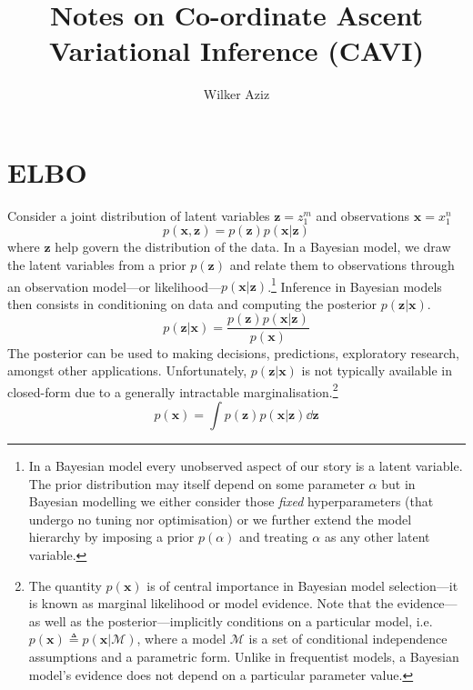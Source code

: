 \documentclass[11pt]{article}
\title{Notes on Co-ordinate Ascent Variational Inference (CAVI)}
\author{Wilker Aziz}
\newcommand{\x}{\ensuremath{\mathbf x}}
\newcommand{\z}{\ensuremath{\mathbf z}}
\begin{document}
\maketitle

\section{ELBO}

Consider a joint distribution of latent variables $\z = z_1^m$ and observations $\x=x_1^n$
\begin{equation}
p(\x, \z) = p(\z)p(\x|\z)
\end{equation}
 where $\z$ help govern the distribution of the data. 
 In a Bayesian model, we draw the latent variables from a prior $p(\z)$ and relate them to observations through an observation model---or likelihood---$p(\x|\z)$.\footnote{
In a Bayesian model every unobserved aspect of our story is a latent variable. The prior distribution may itself depend on some parameter $\alpha$ but in Bayesian modelling we either consider those \emph{fixed} hyperparameters (that undergo no tuning nor optimisation) or we further extend the model hierarchy by imposing a prior $p(\alpha)$ and treating $\alpha$ as any other latent variable.}
Inference in Bayesian models then consists in conditioning on data and computing the posterior $p(\z|\x)$.
 \begin{equation}\label{eq:posterior}
 	p(\z|\x) = \frac{p(\z)p(\x|\z)}{p(\x)}
 \end{equation}
The posterior can be used to making decisions, predictions, exploratory research, amongst other applications. 
Unfortunately, $p(\z|\x)$ is not typically available in closed-form due to a generally intractable marginalisation.\footnote{The quantity $p(\x)$ is of central importance in Bayesian model selection---it is known as marginal likelihood or model evidence. Note that the evidence---as well as the posterior---implicitly conditions on a particular model, i.e. $p(\x) \triangleq p(\x|\mathcal M)$, where a model $\mathcal M$ is a set of conditional independence assumptions and a parametric form. Unlike in frequentist models, a Bayesian model's evidence does not depend on a particular parameter value.}
\begin{equation}
p(\x) = \int p(\z)p(\x|\z) \dd \z
\end{equation}
\end{document}
